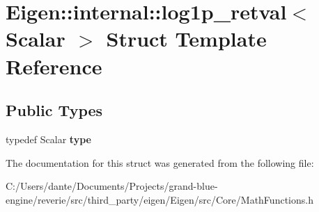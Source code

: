 \hypertarget{struct_eigen_1_1internal_1_1log1p__retval}{}\section{Eigen\+::internal\+::log1p\+\_\+retval$<$ Scalar $>$ Struct Template Reference}
\label{struct_eigen_1_1internal_1_1log1p__retval}
\subsection*{Public Types}
\begin{DoxyCompactItemize}
\item 
\mbox{\label{struct_eigen_1_1internal_1_1log1p__retval_ad20e438f9c73d391972259df9fa21c06}} 
typedef Scalar {\bfseries type}
\end{DoxyCompactItemize}


The documentation for this struct was generated from the following file\+:\begin{DoxyCompactItemize}
\item 
C\+:/\+Users/dante/\+Documents/\+Projects/grand-\/blue-\/engine/reverie/src/third\+\_\+party/eigen/\+Eigen/src/\+Core/Math\+Functions.\+h\end{DoxyCompactItemize}
